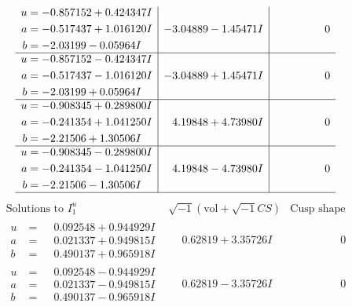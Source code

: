\documentclass[1p]{elsarticle_modified}
\theoremstyle{definition}
\newcommand{\I}{\sqrt{-1}}
\begin{document}
$$\begin{array}{c|c|c}
\begin{aligned}
u &= -0.857152 + 0.424347 I \\
a &= -0.517437 + 1.016120 I \\
b &= -2.03199 - 0.05964 I\end{aligned}
 & -3.04889 - 1.45471 I & \phantom{-0.000000 } 0 \\ \hline\begin{aligned}
u &= -0.857152 - 0.424347 I \\
a &= -0.517437 - 1.016120 I \\
b &= -2.03199 + 0.05964 I\end{aligned}
 & -3.04889 + 1.45471 I & \phantom{-0.000000 } 0 \\ \hline\begin{aligned}
u &= -0.908345 + 0.289800 I \\
a &= -0.241354 + 1.041250 I \\
b &= -2.21506 + 1.30506 I\end{aligned}
 & \phantom{-}4.19848 + 4.73980 I & \phantom{-0.000000 } 0 \\ \hline\begin{aligned}
u &= -0.908345 - 0.289800 I \\
a &= -0.241354 - 1.041250 I \\
b &= -2.21506 - 1.30506 I\end{aligned}
 & \phantom{-}4.19848 - 4.73980 I & \phantom{-0.000000 } 0\\
 \hline 
 \end{array}$$\newpage$$\begin{array}{c|c|c}  
\text{Solutions to }I^u_{1}& \I (\text{vol} + \sqrt{-1}CS) & \text{Cusp shape}\\
 \hline 
\begin{aligned}
u &= \phantom{-}0.092548 + 0.944929 I \\
a &= \phantom{-}0.021337 + 0.949815 I \\
b &= \phantom{-}0.490137 + 0.965918 I\end{aligned}
 & \phantom{-}0.62819 + 3.35726 I & \phantom{-0.000000 } 0 \\ \hline\begin{aligned}
u &= \phantom{-}0.092548 - 0.944929 I \\
a &= \phantom{-}0.021337 - 0.949815 I \\
b &= \phantom{-}0.490137 - 0.965918 I\end{aligned}
 & \phantom{-}0.62819 - 3.35726 I & \phantom{-0.000000 } 0 \\ \hline\begin{aligned}

\end{aligned}
\end{array}$$
\end{document}
